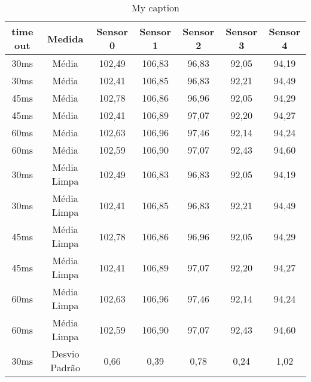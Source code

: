 \begin{table}[]
\centering
\caption{My caption}
\label{my-label}
\begin{tabular}{|c|c|ccccc|}
\hline
\textbf{time out} & \textbf{Medida}     & \textbf{Sensor 0} & \textbf{Sensor 1} & \textbf{Sensor 2} & \textbf{Sensor 3} & \textbf{Sensor 4} \\ \hline
30ms              & Média               & 102,49            & 106,83            & 96,83             & 92,05             & 94,19             \\
30ms              & Média               & 102,41            & 106,85            & 96,83             & 92,21             & 94,49             \\
45ms              & Média               & 102,78            & 106,86            & 96,96             & 92,05             & 94,29             \\
45ms              & Média               & 102,41            & 106,89            & 97,07             & 92,20             & 94,27             \\
60ms              & Média               & 102,63            & 106,96            & 97,46             & 92,14             & 94,24             \\
60ms              & Média               & 102,59            & 106,90            & 97,07             & 92,43             & 94,60             \\ \hline
30ms              & Média Limpa         & 102,49            & 106,83            & 96,83             & 92,05             & 94,19             \\
30ms              & Média Limpa         & 102,41            & 106,85            & 96,83             & 92,21             & 94,49             \\
45ms              & Média Limpa         & 102,78            & 106,86            & 96,96             & 92,05             & 94,29             \\
45ms              & Média Limpa         & 102,41            & 106,89            & 97,07             & 92,20             & 94,27             \\
60ms              & Média Limpa         & 102,63            & 106,96            & 97,46             & 92,14             & 94,24             \\
60ms              & Média Limpa         & 102,59            & 106,90            & 97,07             & 92,43             & 94,60             \\ \hline
30ms              & Desvio Padrão       & 0,66              & 0,39              & 0,78              & 0,24              & 1,02              \\

\end{tabular}
\end{table}
